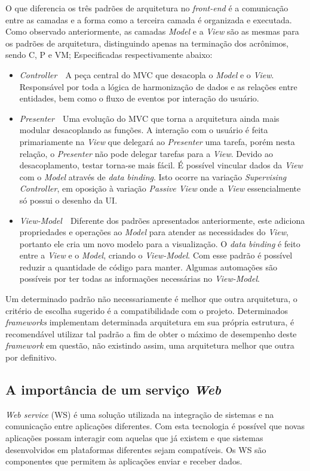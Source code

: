O que diferencia os três padrões de arquitetura no \textit{front-end} é a comunicação entre as camadas e a forma como a terceira camada é organizada e executada. Como observado anteriormente, as camadas \textit{Model} e a \textit{View} são as mesmas para os padrões de arquitetura, distinguindo apenas na terminação dos acrônimos, sendo C, P e VM; Especificadas respectivamente abaixo:
\begin{itemize}
    \item \textit{Controller}~\textemdash~A peça central do MVC que desacopla o \textit{Model} e o \textit{View}. Responsável por toda a lógica de harmonização de dados e as relações entre entidades, bem como o fluxo de eventos por interação do usuário.
    \item \textit{Presenter}~\textemdash~Uma evolução do MVC que torna a arquitetura ainda mais modular desacoplando as funções. A interação com o usuário é feita primariamente na \textit{View} que delegará ao \textit{Presenter} uma tarefa, porém nesta relação, o \textit{Presenter} não pode delegar tarefas para a \textit{View}. Devido ao desacoplamento, testar torna-se mais fácil. É possível vincular dados da \textit{View} com o \textit{Model} através de \textit{data binding}. Isto ocorre na variação \textit{Supervising Controller}, em oposição à variação \textit{Passive View} onde a \textit{View} essencialmente só possui o desenho da UI.
    \item \textit{View-Model}~\textemdash~Diferente dos padrões apresentados anteriormente, este adiciona propriedades e operações ao \textit{Model} para atender as necessidades do \textit{View}, portanto ele cria um novo modelo para a visualização. O \textit{data binding} é feito entre a \textit{View} e o \textit{Model}, criando o \textit{View-Model}. Com esse padrão é possível reduzir a quantidade de código para manter. Algumas automações são possíveis por ter todas as informações necessárias no \textit{View-Model}.
\end{itemize}

Um determinado padrão não necessariamente é melhor que outra arquitetura, o critério de escolha sugerido é a compatibilidade com o projeto. Determinados \textit{frameworks} implementam determinada arquitetura em sua própria estrutura, é recomendável utilizar tal padrão a fim de obter o máximo de desempenho deste \textit{framework} em questão, não existindo assim, uma arquitetura melhor que outra por definitivo.
%
%
%
\subsection{A importância de um serviço \textit{Web}}
\label{SubServicoWeb}
\textit{Web service} (WS) é uma solução utilizada na integração de sistemas e na comunicação entre aplicações diferentes. Com esta tecnologia é possível que novas aplicações possam interagir com aquelas que já existem e que sistemas desenvolvidos em plataformas diferentes sejam compatíveis. Os WS são componentes que permitem às aplicações enviar e receber dados.

